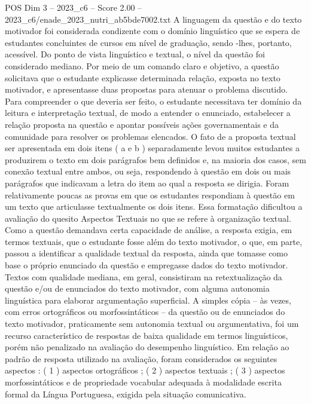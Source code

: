 \begin{textsample}{POS Dim 3 – 2023\_c6 – Score 2.00 – 2023\_c6/enade\_2023\_nutri\_ab5bde7002.txt}
A linguagem da questão e do texto motivador foi considerada condizente com o domínio linguístico que se espera de estudantes concluintes de cursos em nível de graduação, sendo -lhes, portanto, acessível.
Do ponto de vista linguístico e textual, o nível da questão foi considerado mediano.
Por meio de um comando claro e objetivo, a questão solicitava que o estudante explicasse determinada relação, exposta no texto motivador, e apresentasse duas propostas para atenuar o problema discutido.
Para compreender o que deveria ser feito, o estudante necessitava ter domínio da leitura e interpretação textual, de modo a entender o enunciado, estabelecer a relação proposta na questão e apontar possíveis ações governamentais e da comunidade para resolver os problemas elencados.
O fato de a proposta textual ser apresentada em dois itens ( a e b ) separadamente levou muitos estudantes a produzirem o texto em dois parágrafos bem definidos e, na maioria dos casos, sem conexão textual entre ambos, ou seja, respondendo à questão em dois ou mais parágrafos que indicavam a letra do item ao qual a resposta se dirigia.
Foram relativamente poucas as provas em que os estudantes respondiam à questão em um texto que articulasse textualmente os dois itens.
Essa formatação dificultou a avaliação do quesito Aspectos Textuais no que se refere à organização textual.
Como a questão demandava certa capacidade de análise, a resposta exigia, em termos textuais, que o estudante fosse além do texto motivador, o que, em parte, passou a identificar a qualidade textual da resposta, ainda que tomasse como base o próprio enunciado da questão e empregasse dados do texto motivador.
Textos com qualidade mediana, em geral, consistiram na retextualização da questão e/ou de enunciados do texto motivador, com alguma autonomia linguística para elaborar argumentação superficial.
A simples cópia – às vezes, com erros ortográficos ou morfossintáticos – da questão ou de enunciados do texto motivador, praticamente sem autonomia textual ou argumentativa, foi um recurso característico de respostas de baixa qualidade em termos linguísticos, porém não penalizado na avaliação do desempenho linguístico.
Em relação ao padrão de resposta utilizado na avaliação, foram considerados os seguintes aspectos : ( 1 ) aspectos ortográficos ; ( 2 ) aspectos textuais ; ( 3 ) aspectos morfossintáticos e de propriedade vocabular adequada à modalidade escrita formal da Língua Portuguesa, exigida pela situação comunicativa.

\end{textsample}
